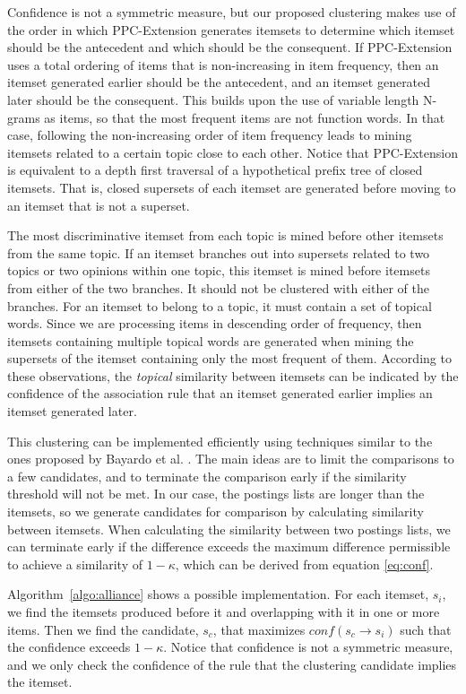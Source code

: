 \documentclass{sig-alternate}
\begin{document}
Confidence is not a symmetric measure,
but our proposed clustering makes use of the order
in which PPC-Extension generates itemsets 
to determine which itemset should be the antecedent 
and which should be the consequent.
If PPC-Extension uses a total ordering 
of items that is non-increasing in item frequency,
then 
an itemset generated earlier 
should be the antecedent, and
an itemset generated later
should be the consequent.
This builds upon the use of
variable length N-grams
as items,
so that the most frequent items
are not function words.
In that case, following the non-increasing order 
of item frequency leads to mining itemsets related 
to a certain topic close to each other.
Notice that PPC-Extension is equivalent to a depth first traversal 
of a hypothetical prefix tree of closed itemsets.
That is, closed supersets of each itemset are generated before 
moving to an itemset that is not a superset. 

The most discriminative itemset from each topic 
is mined before other itemsets from the same topic.
If an itemset branches out into supersets related to two topics 
or two opinions within one topic, this itemset is 
mined before itemsets from 
either of the two branches. It should not 
be clustered with either of the branches.
For an itemset to belong to a topic, it must contain a set of topical words. 
Since we are processing items in descending order of frequency, 
then itemsets containing multiple topical words are generated
when mining the supersets of the itemset containing only 
the most frequent of them.
According to these observations, 
the \emph{topical} similarity between itemsets
can be indicated by
the confidence of 
the association rule that
an itemset generated earlier implies 
an itemset generated later.

This clustering can be implemented efficiently using techniques similar to
the ones proposed by Bayardo et al. \cite{bayardo2007scaling}.
The main ideas are to limit the comparisons to a few candidates,
and to terminate the comparison early if the similarity threshold will not
be met.
In our case, the postings lists are longer than the itemsets,
so we generate candidates for comparison by calculating similarity between
itemsets.
When calculating the similarity between two postings lists,
we can terminate early if the difference exceeds the maximum difference
permissible to achieve a similarity of $1-\kappa$,
which can be derived from equation \ref{eq:conf}. 

Algorithm~\ref{algo:alliance}  shows a possible implementation.
For each itemset, $s_i$, we find the itemsets produced before it
and overlapping with it in one or more items.
Then we find the candidate, $s_c$, that maximizes
$conf(s_c \rightarrow s_i)$ such that the confidence exceeds $1-\kappa$.
Notice that confidence is not a symmetric measure,
and we only check the confidence of the rule that the clustering candidate
implies the itemset. 
\end{document}
